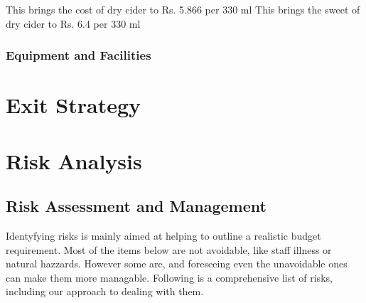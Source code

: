 \documentclass[11pt]{article}
\begin{document}
This brings the cost of dry cider to Rs. 5.866 per 330 ml
This brings the sweet of dry cider to Rs. 6.4 per 330 ml

     \subsubsection{Equipment and Facilities}

\newpage
\section{Exit Strategy}

\newpage
\section{Risk Analysis}

  \subsection{Risk Assessment and Management}
Identyfying risks is mainly aimed at helping to outline a realistic budget requirement. Most of the items below are not avoidable, like staff illness or natural hazzards. However some are, and foreseeing even the unavoidable ones can make them more managable. Following is a comprehensive list of risks, including our approach to dealing with them.
\end{document}
